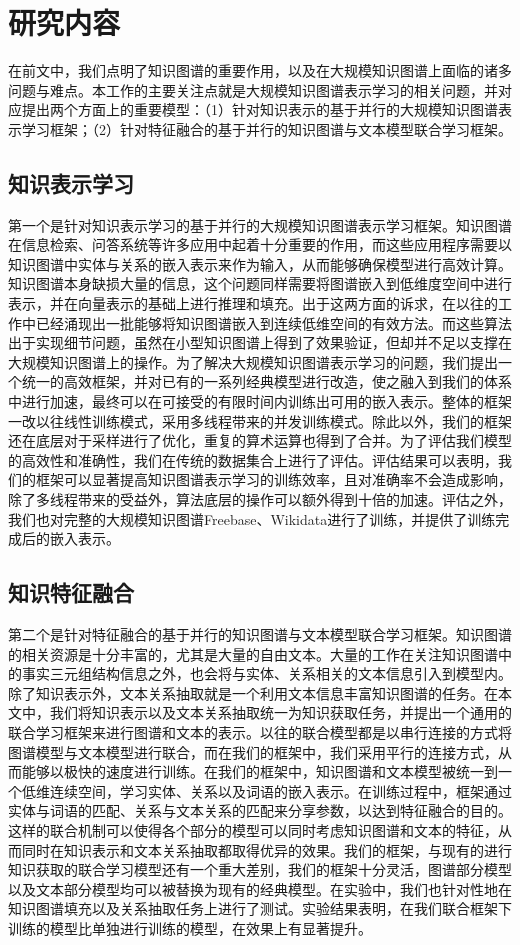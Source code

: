 \section{研究内容}

在前文中，我们点明了知识图谱的重要作用，以及在大规模知识图谱上面临的诸多问题与难点。本工作的主要关注点就是大规模知识图谱表示学习的相关问题，并对应提出两个方面上的重要模型：（1）针对知识表示的基于并行的大规模知识图谱表示学习框架；（2）针对特征融合的基于并行的知识图谱与文本模型联合学习框架。

\subsection{知识表示学习}

第一个是针对知识表示学习的基于并行的大规模知识图谱表示学习框架。知识图谱在信息检索、问答系统等许多应用中起着十分重要的作用，而这些应用程序需要以知识图谱中实体与关系的嵌入表示来作为输入，从而能够确保模型进行高效计算。知识图谱本身缺损大量的信息，这个问题同样需要将图谱嵌入到低维度空间中进行表示，并在向量表示的基础上进行推理和填充。出于这两方面的诉求，在以往的工作中已经涌现出一批能够将知识图谱嵌入到连续低维空间的有效方法。而这些算法出于实现细节问题，虽然在小型知识图谱上得到了效果验证，但却并不足以支撑在大规模知识图谱上的操作。为了解决大规模知识图谱表示学习的问题，我们提出一个统一的高效框架，并对已有的一系列经典模型进行改造，使之融入到我们的体系中进行加速，最终可以在可接受的有限时间内训练出可用的嵌入表示。整体的框架一改以往线性训练模式，采用多线程带来的并发训练模式。除此以外，我们的框架还在底层对于采样进行了优化，重复的算术运算也得到了合并。为了评估我们模型的高效性和准确性，我们在传统的数据集合上进行了评估。评估结果可以表明，我们的框架可以显著提高知识图谱表示学习的训练效率，且对准确率不会造成影响，除了多线程带来的受益外，算法底层的操作可以额外得到十倍的加速。评估之外，我们也对完整的大规模知识图谱Freebase、Wikidata进行了训练，并提供了训练完成后的嵌入表示。

\subsection{知识特征融合}

第二个是针对特征融合的基于并行的知识图谱与文本模型联合学习框架。知识图谱的相关资源是十分丰富的，尤其是大量的自由文本。大量的工作在关注知识图谱中的事实三元组结构信息之外，也会将与实体、关系相关的文本信息引入到模型内。除了知识表示外，文本关系抽取就是一个利用文本信息丰富知识图谱的任务。在本文中，我们将知识表示以及文本关系抽取统一为知识获取任务，并提出一个通用的联合学习框架来进行图谱和文本的表示。以往的联合模型都是以串行连接的方式将图谱模型与文本模型进行联合，而在我们的框架中，我们采用平行的连接方式，从而能够以极快的速度进行训练。在我们的框架中，知识图谱和文本模型被统一到一个低维连续空间，学习实体、关系以及词语的嵌入表示。在训练过程中，框架通过实体与词语的匹配、关系与文本关系的匹配来分享参数，以达到特征融合的目的。这样的联合机制可以使得各个部分的模型可以同时考虑知识图谱和文本的特征，从而同时在知识表示和文本关系抽取都取得优异的效果。我们的框架，与现有的进行知识获取的联合学习模型还有一个重大差别，我们的框架十分灵活，图谱部分模型以及文本部分模型均可以被替换为现有的经典模型。在实验中，我们也针对性地在知识图谱填充以及关系抽取任务上进行了测试。实验结果表明，在我们联合框架下训练的模型比单独进行训练的模型，在效果上有显著提升。

